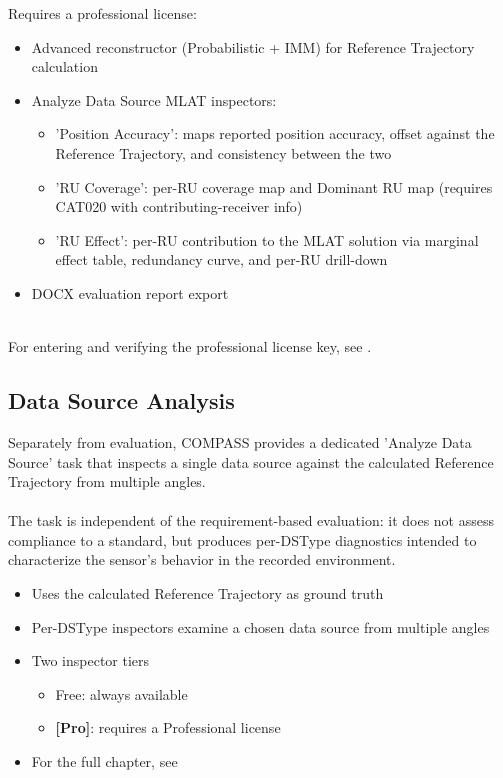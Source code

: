 Requires a professional license:
\begin{itemize}
\item Advanced reconstructor (Probabilistic + IMM) for Reference Trajectory calculation
\item Analyze Data Source MLAT inspectors:
\begin{itemize}
\item 'Position Accuracy': maps reported position accuracy, offset against the Reference Trajectory, and consistency between the two
\item 'RU Coverage': per-RU coverage map and Dominant RU map (requires CAT020 with contributing-receiver info)
\item 'RU Effect': per-RU contribution to the MLAT solution via marginal effect table, redundancy curve, and per-RU drill-down
\end{itemize}
\item DOCX evaluation report export
\end{itemize}
\ \\

For entering and verifying the professional license key, see . \\

\subsection*{Data Source Analysis}

Separately from evaluation, COMPASS provides a dedicated 'Analyze Data Source' task that inspects a single data source against the calculated Reference Trajectory from multiple angles. \\\\

The task is independent of the requirement-based evaluation: it does not assess compliance to a standard, but produces per-DSType diagnostics intended to characterize the sensor's behavior in the recorded environment. \\

\begin{itemize}
\item Uses the calculated Reference Trajectory as ground truth
\item Per-DSType inspectors examine a chosen data source from multiple angles
\item Two inspector tiers
\begin{itemize}
\item Free: always available
\item \textbf{[Pro]}: requires a Professional license
\end{itemize}
\item For the full chapter, see 
\end{itemize}


